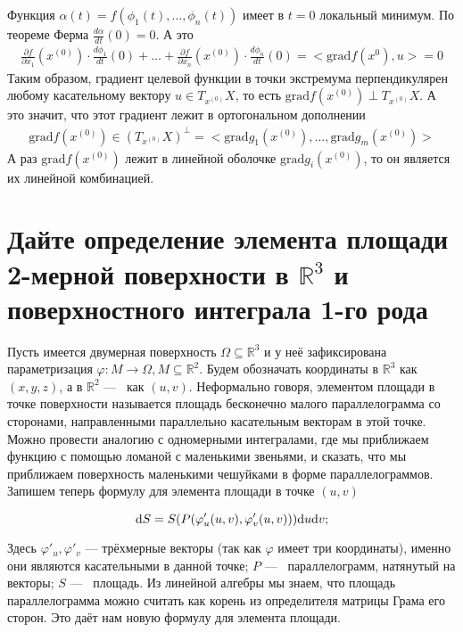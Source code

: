 \documentclass{article}
\begin{document}
Функция $\alpha(t)=f(\phi_1(t),\dotsc,\phi_n(t))$ имеет в $t=0$ локальный минимум. По теореме Ферма $\frac{d \alpha}{dt}(0) = 0$. А это
\begin{gather*}
    \frac{\partial f}{\partial x_1}(x^{(0)})\cdot \frac{d \phi_1}{dt}(0)+
    \dotsc + \frac{\partial f}{\partial x_n}(x^{(0)})\cdot \frac{d \phi_n}{dt}(0) = <\mathrm{grad}f(x^{0}),u> = 0
\end{gather*}
Таким образом, градиент целевой функции в точки экстремума перпендикулярен любому касательному вектору $u \in T_{x^{(0)}}X$, то есть $\mathrm{grad}f(x^{(0)}) \perp T_{x^{(0)}}X$. А это значит, что этот градиент лежит в ортогональном дополнении
\begin{gather*}
    \mathrm{grad}f(x^{(0)}) \in (T_{x^{(0)}}X)^\perp = <\mathrm{grad}g_1(x^{(0)}),\dotsc,\mathrm{grad}g_m(x^{(0)})>
\end{gather*}
А раз $\mathrm{grad}f(x^{(0)})$ лежит в линейной оболочке $\mathrm{grad}g_i(x^{(0)})$, то он является их линейной комбинацией.
	











\setcounter{section}{27}
	\section{Дайте определение элемента площади 2-мерной поверхности в $\mathbb{R}^3$ и поверхностного интеграла 1-го рода}

	Пусть имеется двумерная поверхность $\Omega \subseteq \mathbb{R}^3$ и у неё зафиксирована параметризация $\varphi:M \to \Omega, M \subseteq \mathbb{R}^2$. Будем обозначать координаты в $\mathbb{R}^3$ как $(x, y, z)$, а в $\mathbb{R}^2$ ---~ как $(u, v)$. Неформально говоря, элементом площади в точке поверхности называется площадь бесконечно малого параллелограмма со сторонами, направленными параллельно касательным векторам в этой точке. Можно провести аналогию с одномерными интегралами, где мы приближаем функцию с помощью ломаной с маленькими звеньями, и сказать, что мы приближаем поверхность маленькими чешуйками в форме параллелограммов. Запишем теперь формулу для элемента площади в точке $(u, v)$
	
	\[ \mathrm{d} S = S(P(\varphi'_u(u, v), \varphi'_v(u, v))) \mathrm{d} u \mathrm{d} v; \]

	Здесь $\varphi'_u, \varphi'_v$ --- трёхмерные векторы (так как $\varphi$ имеет три координаты), именно они являются касательными в данной точке; $P$ ---~ параллелограмм, натянутый на векторы; $S$ ---~ площадь. Из линейной алгебры мы знаем, что площадь параллелограмма можно считать как корень из определителя матрицы Грама его сторон. Это даёт нам новую формулу для элемента площади.
\end{document}
